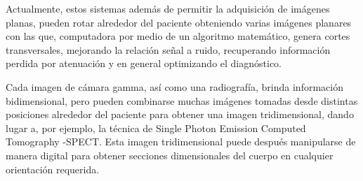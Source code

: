 Actualmente, estos sistemas además de permitir la adquisición de imágenes planas, pueden rotar alrededor del paciente obteniendo varias imágenes planares con las que, computadora por medio de un algoritmo matemático, genera cortes transversales, mejorando la relación señal a ruido, recuperando información perdida por atenuación y en general optimizando el diagnóstico.

Cada imagen de cámara gamma, así como una radiografía, brinda información bidimensional, pero pueden combinarse muchas imágenes tomadas desde distintas posiciones alrededor del paciente para obtener una imagen tridimensional, dando lugar a, por ejemplo, la técnica de Single Photon Emission Computed Tomography -SPECT. Esta imagen tridimensional puede después manipularse de manera digital para obtener secciones dimensionales del cuerpo en cualquier orientación requerida.